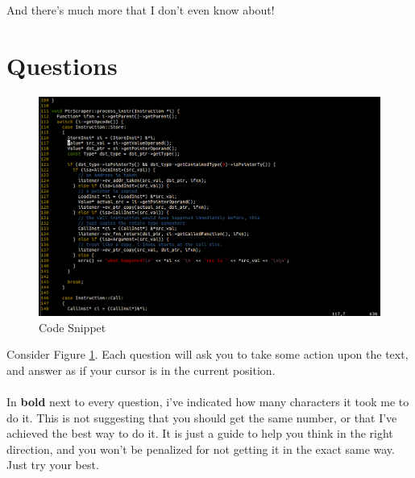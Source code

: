 \noindent
And there's much more that I don't even know about!

\section{Questions}

\begin{figure}
\begin{center}
\leavevmode
\includegraphics[scale=0.3]{images/question-pic.png}
\end{center}
\caption{Code Snippet}
\label{fig:questionpic}
\end{figure}

Consider Figure \ref{fig:questionpic}. Each question will ask you to take some
action upon the text, and answer as if your cursor is in the current position.
\\\\
In {\bf bold} next to every question, i've indicated how many characters
it took me to do it. This is not suggesting that you should get the same number,
or that I've achieved the best way to do it. It is just a guide to help you
think in the right direction, and you won't be penalized for not getting it
in the exact same way. Just try your best.

